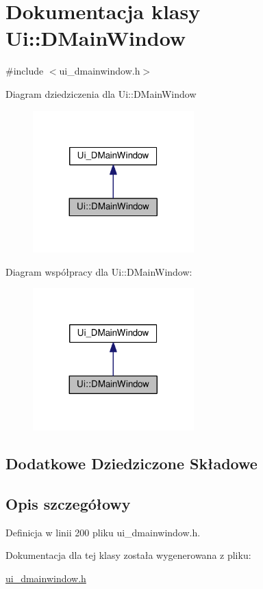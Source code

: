 \hypertarget{class_ui_1_1_d_main_window}{\section{Dokumentacja klasy Ui\-:\-:D\-Main\-Window}
\label{class_ui_1_1_d_main_window}
}


{\ttfamily \#include $<$ui\-\_\-dmainwindow.\-h$>$}



Diagram dziedziczenia dla Ui\-:\-:D\-Main\-Window\nopagebreak
\begin{figure}[H]
\begin{center}
\leavevmode
\includegraphics[width=176pt]{class_ui_1_1_d_main_window__inherit__graph}
\end{center}
\end{figure}


Diagram współpracy dla Ui\-:\-:D\-Main\-Window\-:\nopagebreak
\begin{figure}[H]
\begin{center}
\leavevmode
\includegraphics[width=176pt]{class_ui_1_1_d_main_window__coll__graph}
\end{center}
\end{figure}
\subsection*{Dodatkowe Dziedziczone Składowe}


\subsection{Opis szczegółowy}


Definicja w linii 200 pliku ui\-\_\-dmainwindow.\-h.



Dokumentacja dla tej klasy została wygenerowana z pliku\-:\begin{DoxyCompactItemize}
\item 
\hyperlink{ui__dmainwindow_8h}{ui\-\_\-dmainwindow.\-h}\end{DoxyCompactItemize}
